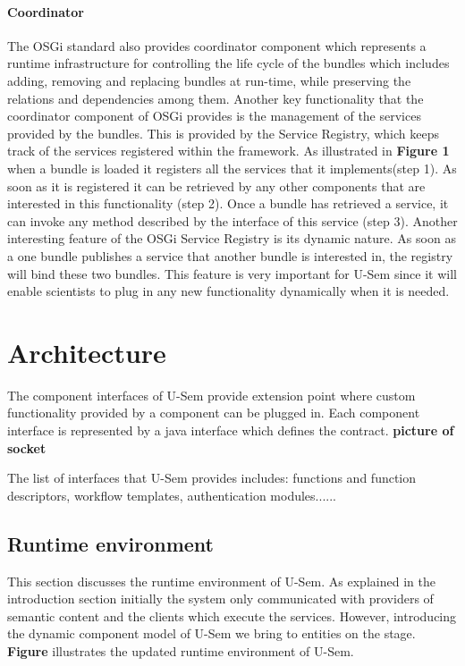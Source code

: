 \paragraph{Coordinator}
The OSGi standard also provides coordinator component which represents a runtime infrastructure for controlling the life cycle of the bundles which includes adding, removing and replacing bundles at run-time, while preserving the relations and dependencies among them. Another key functionality that the coordinator component of OSGi provides is the management of the services provided by the bundles. This is provided by the Service Registry, which keeps track of the services registered within the framework. As illustrated in \textbf{Figure 1} when a bundle is loaded it registers all the services that it implements(step 1). As soon as it is registered it can be retrieved by any other components that are interested in this functionality (step 2). Once a bundle has retrieved a service, it can invoke any method described by the interface of this service (step 3). Another interesting feature of the OSGi Service Registry is its dynamic nature. As soon as a one bundle publishes a service that another bundle is interested in, the registry will bind these two bundles. This feature is very important for U-Sem since it will enable scientists to plug in any new functionality dynamically when it is needed.


\section{Architecture}

The component interfaces of U-Sem provide extension point where custom functionality provided by a component can be plugged in. Each component interface is represented by a java interface which defines the contract. \textbf{picture of socket}


The list of interfaces that U-Sem provides includes: functions and function descriptors, workflow templates, authentication modules......

\subsection{Runtime environment}

This section discusses the runtime environment of U-Sem. As explained in the introduction section initially the system only communicated with providers of semantic content and the clients which execute the services. However, introducing the dynamic component model of U-Sem we bring to entities on the stage. \textbf{Figure} illustrates the updated runtime environment of U-Sem.

